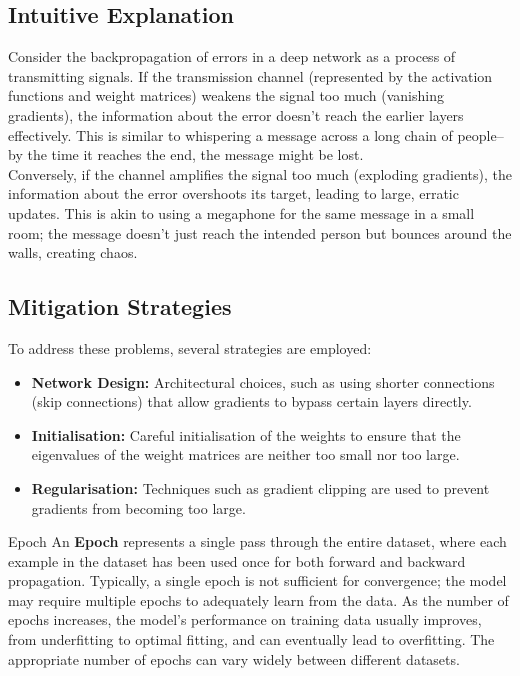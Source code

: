 \subsection*{Intuitive Explanation}
Consider the backpropagation of errors in a deep network as a process of transmitting signals. If the transmission channel (represented by the activation functions and weight matrices) weakens the signal too much (vanishing gradients), the information about the error doesn't reach the earlier layers effectively. This is similar to whispering a message across a long chain of people– by the time it reaches the end, the message might be lost.\\

Conversely, if the channel amplifies the signal too much (exploding gradients), the information about the error overshoots its target, leading to large, erratic updates. This is akin to using a megaphone for the same message in a small room; the message doesn't just reach the intended person but bounces around the walls, creating chaos.

\subsection*{Mitigation Strategies}
To address these problems, several strategies are employed:
\begin{itemize}
    \item \textbf{Network Design:} Architectural choices, such as using shorter connections (skip connections) that allow gradients to bypass certain layers directly.
    \item \textbf{Initialisation:} Careful initialisation of the weights to ensure that the eigenvalues of the weight matrices are neither too small nor too large.
    \item \textbf{Regularisation:} Techniques such as gradient clipping are used to prevent gradients from becoming too large.
\end{itemize}


\begin{definitionbox}{Epoch}
An \textbf{Epoch} represents a single pass through the entire dataset, where each example in the dataset has been used once for both forward and backward propagation. Typically, a single epoch is not sufficient for convergence; the model may require multiple epochs to adequately learn from the data. As the number of epochs increases, the model's performance on training data usually improves, from underfitting to optimal fitting, and can eventually lead to overfitting. The appropriate number of epochs can vary widely between different datasets.
\end{definitionbox}

